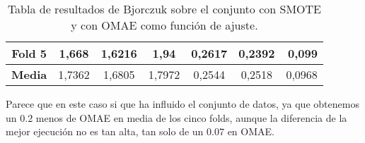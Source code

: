 \begin{table}[H]
{\begin{tabular}{|crrrrrr|}
\multicolumn{1}{|c|}{\textbf{Fold 5}} & \multicolumn{1}{c|}{1,668}             & \multicolumn{1}{c|}{1,6216}              & \multicolumn{1}{c|}{1,94}           & \multicolumn{1}{c|}{0,2617}            & \multicolumn{1}{c|}{0,2392}              & 0,099                              \\ \hline
\multicolumn{1}{|c|}{\textbf{Media}}  & \multicolumn{1}{c|}{1,7362}           & \multicolumn{1}{c|}{1,6805}             & \multicolumn{1}{c|}{1,7972}        & \multicolumn{1}{c|}{0,2544}           & \multicolumn{1}{c|}{0,2518}              & 0,0968                            \\ \hline
\end{tabular}%
}
\caption{Tabla de resultados de Bjorczuk sobre el conjunto con SMOTE y con OMAE como función de ajuste.}\label{tablaBJORCZUKconSMOTEconOMAE}
\end{table}

Parece que en este caso si que ha influido el conjunto de datos, ya que obtenemos un $0.2$ menos de OMAE en media de los cinco folds, aunque la diferencia de la mejor ejecución no es tan alta, tan solo de un $0.07$ en OMAE.

